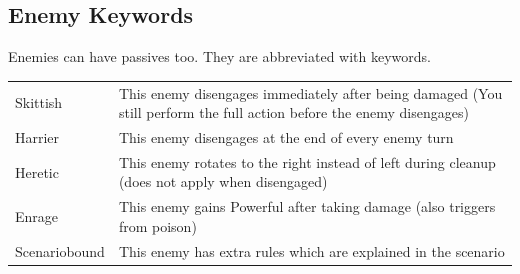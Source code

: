 
\subsection*{Enemy Keywords}
Enemies can have passives too. They are abbreviated with keywords.

\begin{longtable}{|p{2.5cm}|p{13.7cm}|}
	
	\hline
	Skittish & This enemy \symDisengage disengages immediately after being damaged (You still perform the full action before the enemy disengages) \\
	Harrier & This enemy \symDisengage disengages at the end of every enemy turn\\
	Heretic & This enemy rotates to the right instead of left during cleanup (does not apply when disengaged)\\
	Enrage & This enemy gains \symPowerful Powerful after taking damage (also triggers from poison)\\
	Scenariobound & This enemy has extra rules which are explained in the scenario\\
	\hline 
	
\end{longtable}